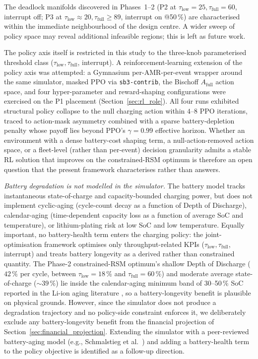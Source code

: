 \documentclass[conference]{IEEEtran}
\begin{document}
The deadlock manifolds discovered in Phases~1--2 (P2 at $\tau_\text{low}=25, \tau_\text{full}=60$, interrupt off; P3 at $\tau_\text{low}\approx 20, \tau_\text{full}\ge 89$, interrupt on @50\,\%) are characterised within the immediate neighbourhood of the design centre. A wider sweep of policy space may reveal additional infeasible regions; this is left as future work.

The policy axis itself is restricted in this study to the three-knob parameterised threshold class ($\tau_\text{low}, \tau_\text{full}$, interrupt). A reinforcement-learning extension of the policy axis was attempted: a Gymnasium per-AMR-per-event wrapper around the same simulator, masked PPO via \texttt{sb3-contrib}, the Bischoff $A_\text{full}$ action space, and four hyper-parameter and reward-shaping configurations were exercised on the P1 placement (Section~\ref{sec:rl_role}). All four runs exhibited structural policy collapse to the null charging action within $4$--$8$ PPO iterations, traced to action-mask asymmetry combined with a sparse battery-depletion penalty whose payoff lies beyond PPO's $\gamma=0.99$ effective horizon. Whether an environment with a dense battery-cost shaping term, a null-action-removed action space, or a fleet-level (rather than per-event) decision granularity admits a stable RL solution that improves on the constrained-RSM optimum is therefore an open question that the present framework characterises rather than answers.

\emph{Battery degradation is not modelled in the simulator.} The battery model tracks instantaneous state-of-charge and capacity-bounded charging power, but does not implement cyclic-aging (cycle-count decay as a function of Depth of Discharge), calendar-aging (time-dependent capacity loss as a function of average SoC and temperature), or lithium-plating risk at low SoC and low temperature. Equally important, no battery-health term enters the charging policy: the joint-optimisation framework optimises only throughput-related KPIs ($\tau_\text{low}, \tau_\text{full}$, interrupt) and treats battery longevity as a derived rather than constrained quantity. The Phase-2 constrained-RSM optimum's shallow Depth of Discharge ($42\,\%$ per cycle, between $\tau_\text{low}=18\,\%$ and $\tau_\text{full}=60\,\%$) and moderate average state-of-charge ($\sim\!39\,\%$) lie inside the calendar-aging minimum band of 30--50\,\% SoC reported in the Li-ion aging literature \cite{keil2016,schmalstieg2014,vetter2005}, so a battery-longevity benefit is plausible on physical grounds. However, since the simulator does not produce a degradation trajectory and no policy-side constraint enforces it, we deliberately exclude any battery-longevity benefit from the financial projection of Section~\ref{sec:financial_projection}. Extending the simulator with a peer-reviewed battery-aging model (e.g., Schmalstieg et al.~\cite{schmalstieg2014}) and adding a battery-health term to the policy objective is identified as a follow-up direction.
\end{document}
